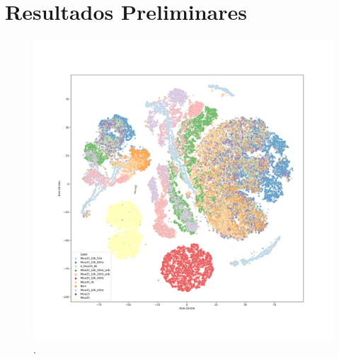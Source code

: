 
\chapter{Resultados Preliminares}

\begin{figure}[H]
    \caption{.}
    \begin{center}
        \includegraphics[scale=.25]{resultados/img/t-sne-1}
    \end{center}
    \label{fig:satelite_completo}
\end{figure}


